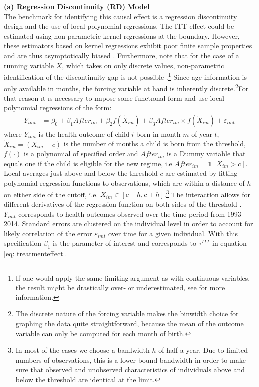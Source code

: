 \documentclass[a4paper ]{article}
\begin{document}
\textbf{(a) Regression Discontinuity (RD) Model}\smallskip\\
The benchmark for identifying this causal effect is a regression discontinuity design and the use of local polynomial regressions. The ITT effect could be estimated using non-parametric kernel regressions at the boundary. However, these estimators based on kernel regressions exhibit poor finite sample properties and are thus asymptotically biased \citep{hahn2001identification, imbens2008regression}. Furthermore, note that for the case of a running variable $X$, which takes on only discrete values, non-parametric identification of the discontinuity gap is not possible \citep{lee2008regression}.\footnote{If one would apply the same limiting argument as with continuous variables, the result might be drastically over- or underestimated, see \cite{lee2008regression} for more information.} Since age information is only available in months, the forcing variable at hand is inherently discrete.\footnote{The discrete nature of the forcing variable makes the binwidth choice for graphing the data quite straightforward, because the mean of the outcome variable can only be computed for each month of birth.}\newline For that reason it is necessary to impose some functional form and use local polynomial regressions of the form:
\begin{align}
Y_{imt} &= \beta_0 + \beta_1 After_{im} + \beta_2 f(\tilde X_{im}) + \beta_3 After_{im} \times f(\tilde X_{im}) + \varepsilon_{imt} \label{eq:RD}\end{align}
where $Y_{imt}$ is the health outcome of child $i$ born in month $m$ of year $t$, $\tilde X_{im}=(X_{im}-c)$ is the number of months a child is born from the threshold, $f(\cdot)$ is a polynomial of specified order and $After_{im}$ is a Dummy variable that equals one if the child is eligible for the new regime, i.e $After_{im}=\mathds{1}[X_{im}>c]$. \newline Local averages just above and below the threshold $c$ are estimated by fitting polynomial regression functions to observations, which are within a distance of $h$ on either side of the cutoff, i.e. $X_{im}\in [c-h,c+h]$.\footnote{In most of the cases we choose a bandwidth $h$ of half a year. Due to limited numbers of observations, this is a lower-bound bandwidth in order to make sure that observed and unobserved characteristics of individuals above and below the threshold are identical at the limit.} The interaction allows for different derivatives of the regression function on both sides of the threshold \citep{lee2010regression}. $Y_{imt}$ corresponds to health outcomes observed over the time period from 1993-2014. Standard errors are clustered on the individual level in order to account for likely correlation of the error $\varepsilon_{imt}$ over time for a given individual. With this specification $\beta_1$ is the parameter of interest and corresponds to $\tau^{ITT}$ in equation \ref{eq: treatmenteffect}.
\end{document}
